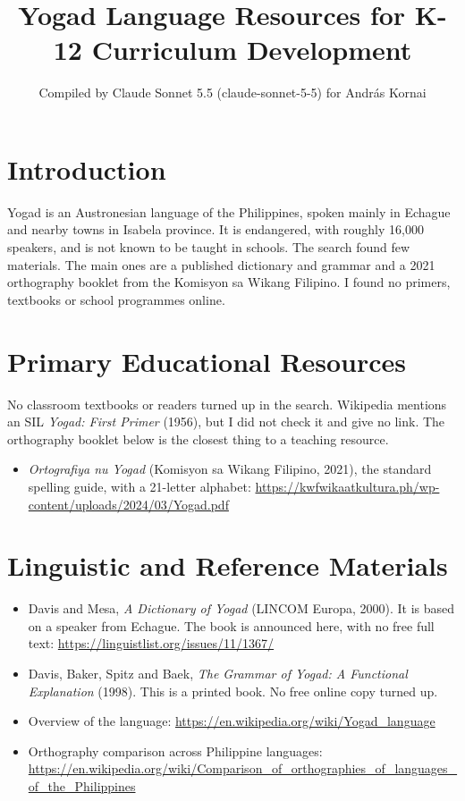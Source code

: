 \documentclass[12pt]{article}
\title{Yogad Language Resources for K-12 Curriculum Development}
\author{Compiled by Claude Sonnet 5.5 (claude-sonnet-5-5) for Andr\'as Kornai}
\date{}
\begin{document}
\maketitle

\section{Introduction}
Yogad is an Austronesian language of the Philippines, spoken mainly in Echague and nearby towns in Isabela province. It is endangered, with roughly 16,000 speakers, and is not known to be taught in schools. The search found few materials. The main ones are a published dictionary and grammar and a 2021 orthography booklet from the Komisyon sa Wikang Filipino. I found no primers, textbooks or school programmes online.

\section{Primary Educational Resources}
No classroom textbooks or readers turned up in the search. Wikipedia mentions an SIL \emph{Yogad: First Primer} (1956), but I did not check it and give no link. The orthography booklet below is the closest thing to a teaching resource.
\begin{itemize}
\item \emph{Ortografiya nu Yogad} (Komisyon sa Wikang Filipino, 2021), the standard spelling guide, with a 21-letter alphabet: \url{https://kwfwikaatkultura.ph/wp-content/uploads/2024/03/Yogad.pdf}
\end{itemize}

\section{Linguistic and Reference Materials}
\begin{itemize}
\item Davis and Mesa, \emph{A Dictionary of Yogad} (LINCOM Europa, 2000). It is based on a speaker from Echague. The book is announced here, with no free full text: \url{https://linguistlist.org/issues/11/1367/}
\item Davis, Baker, Spitz and Baek, \emph{The Grammar of Yogad: A Functional Explanation} (1998). This is a printed book. No free online copy turned up.
\item Overview of the language: \url{https://en.wikipedia.org/wiki/Yogad_language}
\item Orthography comparison across Philippine languages: \url{https://en.wikipedia.org/wiki/Comparison_of_orthographies_of_languages_of_the_Philippines}
\end{itemize}
\end{document}
